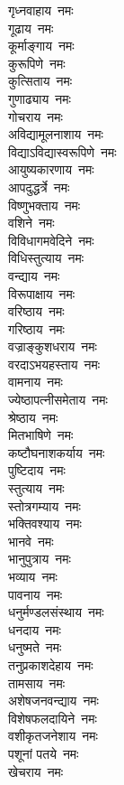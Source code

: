 \begin{flushleft}
\begin{multicols}{2}
गृध्नवाहाय~नमः\\
गूढाय~नमः\\
कूर्माङ्गाय~नमः\\
कुरूपिणे~नमः\\
कुत्सिताय~नमः\\
गुणाढ्याय~नमः\\
गोचराय~नमः\\
अविद्यामूलनाशाय~नमः\\
विद्याऽविद्यास्वरूपिणे~नमः\hfill{}\\
आयुष्यकारणाय~नमः\\
आपदुद्धर्त्रे~नमः\\
विष्णुभक्ताय~नमः\\
वशिने~नमः\\
विविधागमवेदिने~नमः\\
विधिस्तुत्याय~नमः\\
वन्द्याय~नमः\\
विरूपाक्षाय~नमः\\
वरिष्ठाय~नमः\\
गरिष्ठाय~नमः\hfill{}\\
वज्राङ्कुशधराय~नमः\\
वरदाऽभयहस्ताय~नमः\\
वामनाय~नमः\\
ज्येष्ठापत्नीसमेताय~नमः\\
श्रेष्ठाय~नमः\\
मितभाषिणे~नमः\\
कष्टौघनाशकर्याय~नमः\\
पुष्टिदाय~नमः\\
स्तुत्याय~नमः\\
स्तोत्रगम्याय~नमः\hfill{}\\
भक्तिवश्याय~नमः\\
भानवे~नमः\\
भानुपुत्राय~नमः\\
भव्याय~नमः\\
पावनाय~नमः\\
धनुर्मण्डलसंस्थाय~नमः\\
धनदाय~नमः\\
धनुष्मते~नमः\\
तनुप्रकाशदेहाय~नमः\\
तामसाय~नमः\hfill{}\\
अशेषजनवन्द्याय~नमः\\
विशेषफलदायिने~नमः\\
वशीकृतजनेशाय~नमः\\
पशूनां पतये~नमः\\
खेचराय~नमः\\

\end{multicols}
\end{flushleft}
